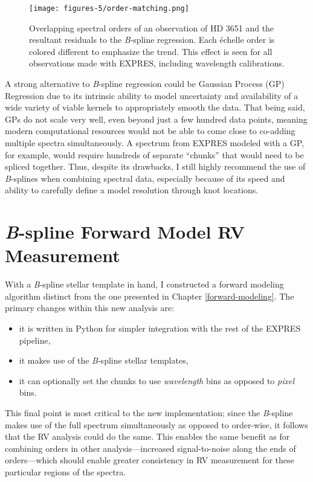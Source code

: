 \begin{figure}[H]
    \centering
    \texttt{[image: figures-5/order-matching.png]}
    \caption{Overlapping spectral orders of an observation of HD 3651 and the resultant residuals to the \textit{B}-spline regression. Each \'{e}chelle order is colored different to emphasize the trend. This effect is seen for all observations made with EXPRES, including wavelength calibrations.}
    \label{fig:my_label}
\end{figure}

A strong alternative to \textit{B}-spline regression could be Gaussian Process (GP) Regression \citep{rajpaul_robust_2020} due to its intrinsic ability to model uncertainty and availability of a wide variety of viable kernels to appropriately smooth the data. That being said, GPs do not scale very well, even beyond just a few hundred data points, meaning modern computational resources would not be able to come close to co-adding multiple spectra simultaneously. A spectrum from EXPRES modeled with a GP, for example, would require hundreds of separate ``chunks'' that would need to be spliced together. Thus, despite its drawbacks, I still highly recommend the use of \textit{B}-splines when combining spectral data, especially because of its speed and ability to carefully define a model resolution through knot locations.

\section{\textit{B}-spline Forward Model RV Measurement} \label{pipeline2:forward-model}

With a \textit{B}-spline stellar template in hand, I constructed a forward modeling algorithm distinct from the one presented in Chapter \ref{forward-modeling}. The primary changes within this new analysis are:
\begin{itemize}
    \item it is written in Python for simpler integration with the rest of the EXPRES pipeline,
    \item it makes use of the \textit{B}-spline stellar templates,
    \item it can optionally set the chunks to use \textit{wavelength} bins as opposed to \textit{pixel} bins.
\end{itemize}
This final point is most critical to the new implementation; since the \textit{B}-spline makes use of the full spectrum simultaneously as opposed to order-wise, it follows that the RV analysis could do the same. This enables the same benefit as for combining orders in other analysis---increased signal-to-noise along the ends of orders---which should enable greater consistency in RV measurement for these particular regions of the spectra.

